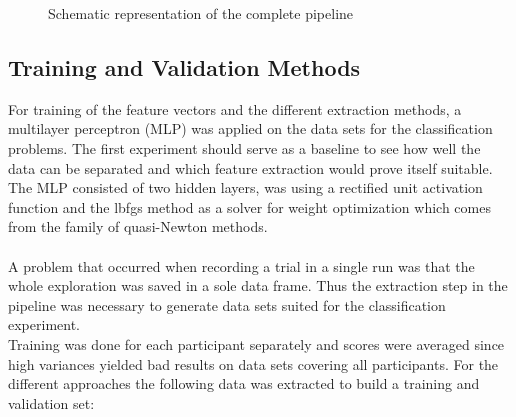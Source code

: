 \begin{figure}[h]
	\caption{Schematic representation of the complete pipeline}
	\label{pipeline}
\end{figure}

\subsection{Training and Validation Methods}
For training of the feature vectors and the different extraction methods, a multilayer perceptron (MLP) was applied on the data sets for the classification problems. The first experiment should serve as a baseline to see how well the data can be separated and which feature extraction would prove itself suitable. The MLP consisted of two hidden layers, was using a rectified unit activation function and the lbfgs method as a solver for weight optimization which comes from the family of quasi-Newton methods.\\
\\
A problem that occurred when recording a trial in a single run was that the whole exploration was saved in a sole data frame. Thus the extraction step in the pipeline was necessary to generate data sets suited for the classification experiment.\\
Training was done for each participant separately and scores were averaged since high variances yielded bad results on data sets covering all participants. For the different approaches the following data was extracted to build a training and validation set:

